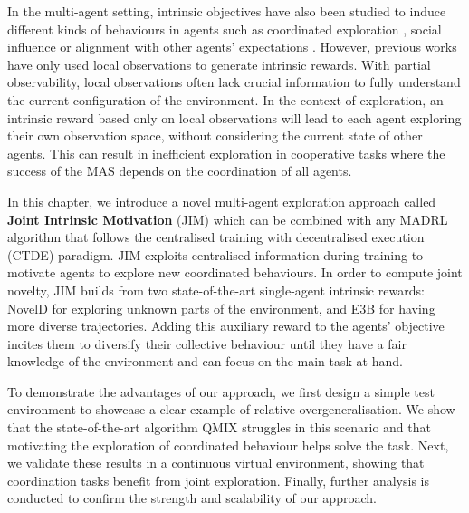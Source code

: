In the multi-agent setting, intrinsic objectives have also been studied to induce different kinds of behaviours in agents such as coordinated exploration \citep{Iqbal2019_MultiExplore}, social influence \citep{Jaques2019_SocialInfluence, Wang2020_EITI} or alignment with other agents' expectations \citep{Ma2022_ELIGN}. However, previous works have only used local observations to generate intrinsic rewards. With partial observability, local observations often lack crucial information to fully understand the current configuration of the environment. In the context of exploration, an intrinsic reward based only on local observations will lead to each agent exploring their own observation space, without considering the current state of other agents. This can result in inefficient exploration in cooperative tasks where the success of the MAS depends on the coordination of all agents.

In this chapter, we introduce a novel multi-agent exploration approach called \textbf{Joint Intrinsic Motivation} (JIM) which can be combined with any MADRL algorithm that follows the centralised training with decentralised execution (CTDE) para\-digm. JIM exploits centralised information during training to motivate agents to explore new coordinated behaviours. In order to compute joint novelty, JIM builds from two state-of-the-art single-agent intrinsic rewards: NovelD \citep{Zhang2021_NovelD} for exploring unknown parts of the environment, and E3B \citep{Henaff2022_E3B} for having more diverse trajectories. Adding this auxiliary reward to the agents' objective incites them to diversify their collective behaviour until they have a fair knowledge of the environment and can focus on the main task at hand. 

To demonstrate the advantages of our approach, we first design a simple test environment to showcase a clear example of relative overgeneralisation. We show that the state-of-the-art algorithm QMIX \citep{Rashid2018_QMIX} struggles in this scenario and that motivating the exploration of coordinated behaviour helps solve the task. Next, we validate these results in a continuous virtual environment, showing that coordination tasks benefit from joint exploration. Finally, further analysis is conducted to confirm the strength and scalability of our approach.







